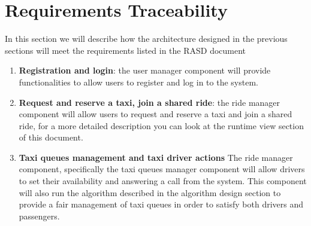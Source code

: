 \section{Requirements Traceability}
In this section we will describe how the architecture designed in the previous sections will meet the requirements listed in the RASD document

\begin{enumerate}
	\item \textbf{Registration and login}: the user manager component will provide functionalities to allow users to register and log in to the system.
	\item \textbf{Request and reserve a taxi, join a shared ride}: the ride manager component will allow users to request and reserve a taxi and join a shared ride, for a more detailed description you can look at the runtime view section of this document.
	\item \textbf{Taxi queues management and taxi driver actions} The ride manager component, specifically the taxi queues manager component will allow drivers to set their availability and answering a call from the system. This component will also run the algorithm described in the algorithm design section to provide a fair management of taxi queues in order to satisfy both drivers and passengers.
\end{enumerate}